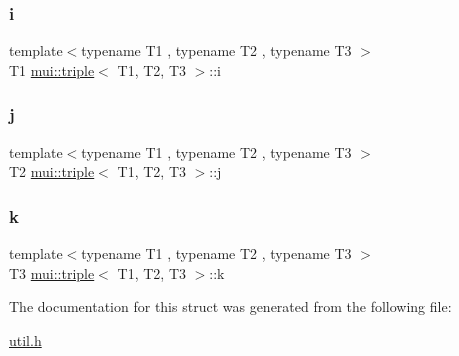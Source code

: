 \subsubsection{\texorpdfstring{i}{i}}
{\footnotesize\ttfamily template$<$typename T1 , typename T2 , typename T3 $>$ \\
T1 \hyperlink{structmui_1_1triple}{mui\+::triple}$<$ T1, T2, T3 $>$\+::i}

\mbox{\label{structmui_1_1triple_a26e88cc76064ce7181528c4685205e5e}} 
\subsubsection{\texorpdfstring{j}{j}}
{\footnotesize\ttfamily template$<$typename T1 , typename T2 , typename T3 $>$ \\
T2 \hyperlink{structmui_1_1triple}{mui\+::triple}$<$ T1, T2, T3 $>$\+::j}

\mbox{\label{structmui_1_1triple_a34456ec40e7bfdeb5ee0933cb0f2c5ba}} 
\subsubsection{\texorpdfstring{k}{k}}
{\footnotesize\ttfamily template$<$typename T1 , typename T2 , typename T3 $>$ \\
T3 \hyperlink{structmui_1_1triple}{mui\+::triple}$<$ T1, T2, T3 $>$\+::k}



The documentation for this struct was generated from the following file\+:\begin{DoxyCompactItemize}
\item 
\hyperlink{util_8h}{util.\+h}\end{DoxyCompactItemize}

